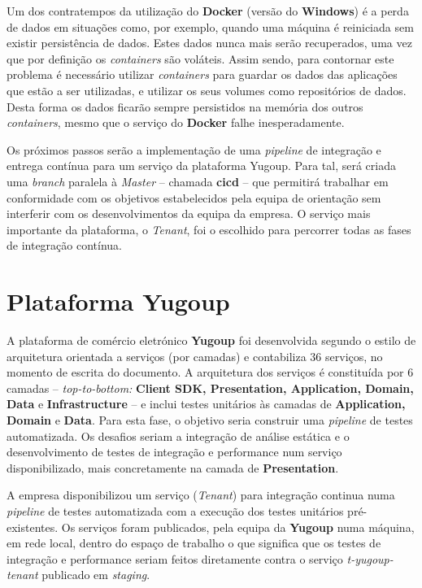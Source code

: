 \hspace{1cm}Um dos contratempos da utilização do \textbf{Docker} (versão do \textbf{Windows}) é a perda de dados em situações como, por exemplo, quando uma máquina é reiniciada sem existir persistência de dados. Estes dados nunca mais serão recuperados, uma vez que por definição os \textit{containers} são voláteis. Assim sendo, para contornar este problema é necessário utilizar \textit{containers} para guardar os dados das aplicações que estão a ser utilizadas, e utilizar os seus volumes como repositórios de dados. Desta forma os dados ficarão sempre persistidos na memória dos outros \textit{containers}, mesmo que o serviço do \textbf{Docker} falhe inesperadamente.

\hspace{1cm}Os próximos passos serão a implementação de uma \textit{pipeline} de integração e entrega contínua para um serviço da plataforma Yugoup. Para tal, será criada uma \textit{branch} paralela à \textit{Master} -- chamada \textbf{cicd} -- que permitirá trabalhar em conformidade com os objetivos estabelecidos pela equipa de orientação sem interferir com os desenvolvimentos da equipa da empresa. O serviço mais importante da plataforma, o \textit{Tenant}, foi o escolhido para percorrer todas as fases de integração contínua.

\section{Plataforma Yugoup}
\label{Ch:Plataforma Yugoup}

\hspace{1cm}A plataforma de comércio eletrónico \textbf{Yugoup} foi desenvolvida segundo o estilo de arquitetura orientada a serviços (por camadas) e contabiliza 36 serviços, no momento de escrita do documento. A arquitetura dos serviços é constituída por 6 camadas -- \textit{top-to-bottom:} \textbf{Client SDK, Presentation, Application, Domain, Data} e \textbf{Infrastructure} -- e inclui testes unitários às camadas de \textbf{Application, Domain} e \textbf{Data}. Para esta fase, o objetivo seria construir uma \textit{pipeline} de testes automatizada. Os desafios seriam a integração de análise estática e o desenvolvimento de testes de integração e performance num serviço disponibilizado, mais concretamente na camada de \textbf{Presentation}. 

\hspace{1cm}A empresa disponibilizou um serviço (\textit{Tenant}) para integração continua numa \textit{pipeline} de testes automatizada com a execução dos testes unitários pré-existentes. Os serviços foram publicados, pela equipa da \textbf{Yugoup} numa máquina, em rede local, dentro do espaço de trabalho o que significa que os testes de integração e performance seriam feitos diretamente contra o serviço \textit{t-yugoup-tenant} publicado em \textit{staging}.

